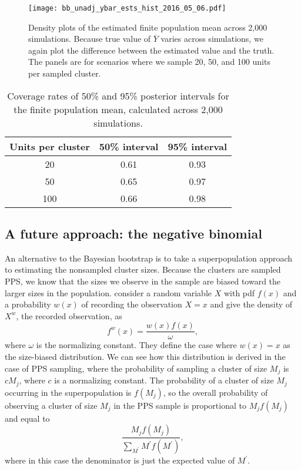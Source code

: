 \documentclass[12pt,a4paper]{article}
\begin{document}

\begin{figure}
	\centering
	\texttt{[image: bb\_unadj\_ybar\_ests\_hist\_2016\_05\_06.pdf]}
	\caption{Density plots of the estimated finite population mean across 2,000 simulations. Because true value of $\overline{Y}$ varies across simulations, we again plot the difference between the estimated value and the truth. The panels are for scenarios where we sample 20, 50, and 100 units per sampled cluster.}
	\label{fig:bb_ybar_hist}
\end{figure}

\begin{table}[h!]\label{tab:bbcovg}
	\centering
	\begin{tabular}{c|c|c}
		Units per cluster & 50\% interval & 95\% interval \\
		\hline
		20 & 0.61 & 0.93 \\
		50 & 0.65 & 0.97 \\
		100 & 0.66 & 0.98
	\end{tabular}
	\caption{Coverage rates of 50\% and 95\% posterior intervals for the finite population mean, calculated across 2,000 simulations.}
\end{table}


\subsection*{A future approach: the negative binomial}
An alternative to the Bayesian bootstrap is to take a superpopulation approach to estimating the nonsampled cluster sizes. Because the clusters are sampled PPS, we know that the sizes we observe in the sample are biased toward the larger sizes in the population. \cite{pr1978} consider a random variable $X$ with pdf $f(x)$ and a probability $w(x)$ of recording the observation $X=x$ and give the density of $X^w$, the recorded observation, as
\[
	f^w(x) = \frac{w(x)f(x)}{\omega},
\]
where $\omega$ is the normalizing constant. They define the case where $w(x)=x$ as the size-biased distribution. We can see how this distribution is derived in the case of PPS sampling, where the probability of sampling a cluster of size $M_j$ is $cM_j$, where $c$ is a normalizing constant. The probability of a cluster of size $M_j$ occurring in the superpopulation is $f(M_j)$, so the overall probability of observing a cluster of size $M_j$ in the PPS sample is proportional to $M_j f(M_j)$ and equal to
\[
	\frac{M_j f(M_j)}{\sum_{M^{\prime}} M^{\prime} f(M^{\prime})},
\]
where in this case the denominator is just the expected value of $M^{\prime}$.
\end{document}
